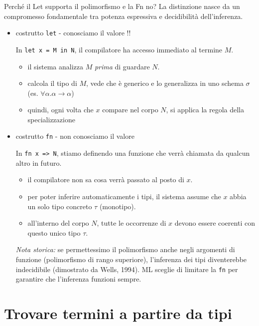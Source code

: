 \documentclass[a4paper,11pt]{report}
\begin{document}
\begin{gframe}{Perché il Let supporta il polimorfismo e la Fn no?}
    La distinzione nasce da un compromesso fondamentale tra potenza espressiva e decidibilità dell'inferenza.


    \begin{itemize}
        \item costrutto \texttt{let} - conosciamo il valore !!

    In \texttt{let x = M in N}, il compilatore ha accesso immediato al termine \( M \).
    \begin{itemize}
        \item il sistema analizza \( M \) \textit{prima} di guardare \( N \).
        \item calcola il tipo di \( M \), vede che è generico e lo generalizza in uno schema \( \sigma \) (es. \( \forall \alpha. \alpha \to \alpha \))
        \item quindi, ogni volta che \( x \) compare nel corpo \( N \), si applica la regola della specializzazione
    \end{itemize}

\item costrutto \texttt{fn} - non conosciamo il valore

    In \texttt{fn x => N}, stiamo definendo una funzione che verrà chiamata da qualcun altro in futuro.
    \begin{itemize}
        \item il compilatore non sa cosa verrà passato al posto di \( x \).
        \item per poter inferire automaticamente i tipi, il sistema assume che \( x \) abbia un solo tipo concreto \( \tau \) (monotipo).
        \item all'interno del corpo \( N \), tutte le occorrenze di \( x \) devono essere coerenti con questo unico tipo \( \tau \).
    \end{itemize}

       \textit{Nota storica:} se permettessimo il polimorfismo anche negli argomenti di funzione (polimorfismo di rango superiore), l'inferenza dei tipi diventerebbe indecidibile (dimostrato da Wells, 1994). ML sceglie di limitare la \texttt{fn} per garantire che l'inferenza funzioni sempre.
    \end{itemize}
\end{gframe}

\section{Trovare termini a partire da tipi}
\end{document}
